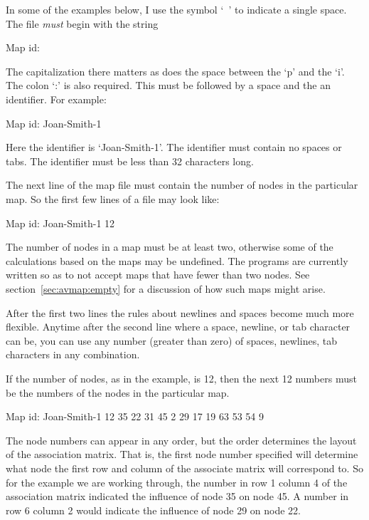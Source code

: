 \documentclass[%
	11pt,
        a4paper,
        twoside]{workrep}
\begin{document}
In some of the examples below, I use the symbol `\verb*| |' to indicate
a single space.
The file \emph{must} begin with the string

\begin{verbatim*}
Map id: 
\end{verbatim*}

The capitalization there matters as does the space between the `p'
and the `i'.  The colon `:' is also required.  This must be followed
by a space and the an identifier.  For example:

\begin{verbatim*}
Map id: Joan-Smith-1
\end{verbatim*}
Here the identifier is `Joan-Smith-1'.  The identifier must contain
no spaces or tabs.  The identifier must be less than 32 characters
long.

The next line of the map file must contain the number of nodes in the
particular map.  So the first few lines of a file may look like:
\begin{verbatim*}
Map id: Joan-Smith-1
12
\end{verbatim*}
The number of nodes in a map must be at least two, otherwise some
of the calculations based on the maps may be undefined.  The
programs are currently written so as to not accept maps that have
fewer than two nodes.  See section~\ref{sec:avmap:empty} for a discussion
of how such maps might arise.

After the first two lines the rules about newlines and spaces become
much more flexible.  Anytime after the second line where a space,
newline, or tab character can be, you can use any number (greater
than zero) of spaces, newlines, tab characters in any combination.

If the number of nodes, as in the example, is 12, then the next 12
numbers must be the numbers of the nodes in the particular map.

\begin{verbatim*}
Map id: Joan-Smith-1
12
35 22 31 45  2 29 17 19 63 53 54  9
\end{verbatim*}

The node numbers can appear in any order, but the order determines
the layout of the association matrix.  That is, the first node number
specified will determine what node the first row and column of the
associate matrix will correspond to.  So for the example we are
working through, the number in row 1 column 4 of the association
matrix indicated the influence of node 35 on node 45.  A number in
row 6 column 2 would indicate the influence of node 29 on node 22.
\end{document}
